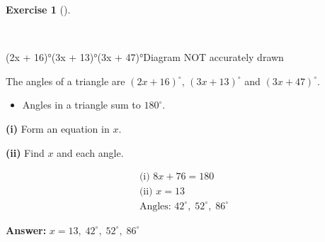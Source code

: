 \documentclass[
  letterpaper,
  DIV=11,
  numbers=noendperiod]{scrreprt}
\providecommand{\tightlist}{%
  \setlength{\itemsep}{0pt}\setlength{\parskip}{0pt}}
\theoremstyle{definition}
\newtheorem{exercise}{Exercise}[chapter]
\theoremstyle{remark}
\begin{document}
\begin{exercise}[]\protect\hypertarget{exr-u5-19-1}{}\label{exr-u5-19-1}

~

(2x + 16)°(3x + 13)°(3x + 47)°Diagram NOT accurately drawn

The angles of a triangle are \((2x + 16)^\circ\), \((3x + 13)^\circ\)
and \((3x + 47)^\circ\).

\begin{itemize}
\tightlist
\item
  Angles in a triangle sum to \(180^\circ\).
\end{itemize}

\textbf{(i)} Form an equation in \(x\).

\textbf{(ii)} Find \(x\) and each angle.

\begin{tcolorbox}[enhanced jigsaw, opacitybacktitle=0.6, coltitle=black, arc=.35mm, colframe=quarto-callout-tip-color-frame, colback=white, bottomrule=.15mm, left=2mm, colbacktitle=quarto-callout-tip-color!10!white, titlerule=0mm, opacityback=0, title=\textcolor{quarto-callout-tip-color}{\faLightbulb}\hspace{0.5em}{🔍 View Solution}, leftrule=.75mm, breakable, rightrule=.15mm, bottomtitle=1mm, toptitle=1mm, toprule=.15mm]

\begin{align*}
\text{(i) } 8x + 76 = 180 \\ \text{(ii) } x = 13 \\ \text{Angles: }42^\circ,\; 52^\circ,\; 86^\circ
\end{align*}

\textbf{Answer:} \(x=13,\; 42^\circ,\; 52^\circ,\; 86^\circ\)

\end{tcolorbox}

\end{exercise}
\end{document}
